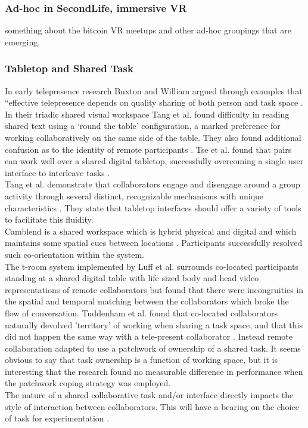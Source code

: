 \subsubsection{Ad-hoc in SecondLife, immersive VR}
something about the bitcoin VR meetups and other ad-hoc groupings that are emerging.
  \subsubsection{Tabletop and Shared Task}
In early telepresence research Buxton and William argued through examples that ``effective telepresence depends on quality sharing of both person and task space \cite{Buxton1992a}.\\
In their triadic shared visual workspace Tang et al. found difficulty in reading shared text using a `round the table' configuration, a marked preference for working collaboratively on the same side of the table. They also found additional confusion as to the identity of remote participants \cite{Tang2010}.
Tse et al. found that pairs can work well over a shared digital tabletop, successfully overcoming a single user interface to interleave tasks \cite{Tse2007}.\\
Tang et al. demonstrate that collaborators engage and disengage around a group activity through several distinct, recognizable mechanisms with unique characteristics \cite{Tang2006}. They state that tabletop interfaces should offer a variety of tools to facilitate this fluidity.\\
Camblend is a shared workspace which is hybrid physical and digital and which maintains some spatial cues between locations \cite{Norris2013a, Norris2012}. Participants successfully resolved such co-orientation within the system.\\
The t-room system implemented by Luff et al. surrounds co-located participants standing at a shared digital table with life sized body and head video representations of remote collaborators \cite{Luff2011} but found that there were incongruities in the spatial and temporal matching between the collaborators which broke the flow of conversation.
Tuddenham et al. found that co-located collaborators naturally devolved 'territory' of working when sharing a task space, and that this did not happen the same way with a tele-present collaborator \cite{tuddenham2009territorial}. Instead remote collaboration adapted to use a patchwork of ownership of a shared task. It seems obvious to say that task ownership is a function of working space, but it is interesting that the research found no measurable difference in performance when the patchwork coping strategy was employed.\\
The nature of a shared collaborative task and/or interface directly impacts the style of interaction between collaborators. This will have a bearing on the choice of task for experimentation \cite{Jamil2011, Jetter2011a}.

